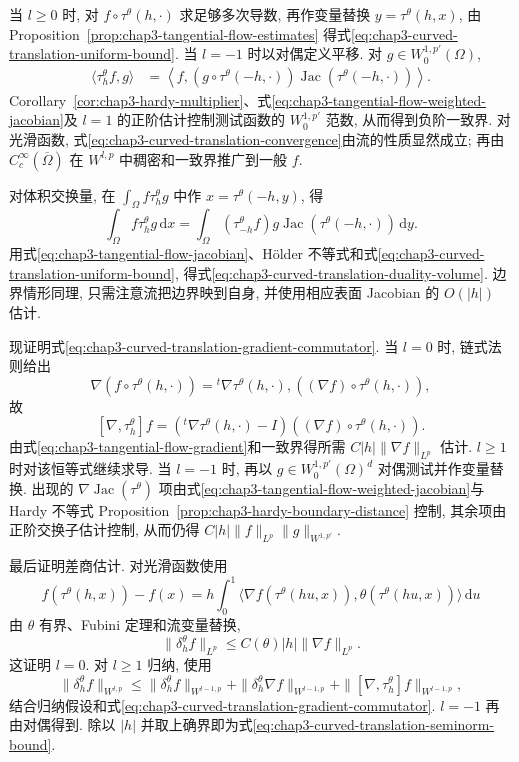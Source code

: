 \begin{Proof}
当 $l\geq0$ 时, 对 $f\circ\tau^\theta(h,\cdot)$ 求足够多次导数, 再作变量替换 $y=\tau^\theta(h,x)$, 由 Proposition~\ref{prop:chap3-tangential-flow-estimates} 得式\eqref{eq:chap3-curved-translation-uniform-bound}. 当 $l=-1$ 时以对偶定义平移. 对 $g\in W_0^{1,p'}(\Omega)$,
\begin{align*}
 \langle\tau_h^\theta f,g\rangle
 &=\left\langle f,
 (g\circ\tau^\theta(-h,\cdot))
 \operatorname{Jac}(\tau^\theta(-h,\cdot))\right\rangle.
\end{align*}
Corollary~\ref{cor:chap3-hardy-multiplier}、式\eqref{eq:chap3-tangential-flow-weighted-jacobian}及 $l=1$ 的正阶估计控制测试函数的 $W_0^{1,p'}$ 范数, 从而得到负阶一致界. 对光滑函数, 式\eqref{eq:chap3-curved-translation-convergence}由流的性质显然成立; 再由 $C_c^\infty(\overline\Omega)$ 在 $W^{l,p}$ 中稠密和一致界推广到一般 $f$.

对体积交换量, 在 $\int_\Omega f\tau_h^\theta g$ 中作 $x=\tau^\theta(-h,y)$, 得
\[
 \int_\Omega f\tau_h^\theta g\,\mathrm dx
 =\int_\Omega(\tau_{-h}^\theta f)g
 \operatorname{Jac}(\tau^\theta(-h,\cdot))\,\mathrm dy.
\]
用式\eqref{eq:chap3-tangential-flow-jacobian}、H\"older 不等式和式\eqref{eq:chap3-curved-translation-uniform-bound}, 得式\eqref{eq:chap3-curved-translation-duality-volume}. 边界情形同理, 只需注意流把边界映到自身, 并使用相应表面 Jacobian 的 $O(|h|)$ 估计.

现证明式\eqref{eq:chap3-curved-translation-gradient-commutator}. 当 $l=0$ 时, 链式法则给出
\[
 \nabla(f\circ\tau^\theta(h,\cdot))
 ={}^t\nabla\tau^\theta(h,\cdot),((\nabla f)\circ\tau^\theta(h,\cdot)),
\]
故
\[
 [\nabla,\tau_h^\theta]f
 =({}^t\nabla\tau^\theta(h,\cdot)-I)
 ((\nabla f)\circ\tau^\theta(h,\cdot)).
\]
由式\eqref{eq:chap3-tangential-flow-gradient}和一致界得所需 $C|h|\|\nabla f\|_{L^p}$ 估计. $l\geq1$ 时对该恒等式继续求导. 当 $l=-1$ 时, 再以 $g\in W_0^{1,p'}(\Omega)^d$ 对偶测试并作变量替换. 出现的 $\nabla\operatorname{Jac}(\tau^\theta)$ 项由式\eqref{eq:chap3-tangential-flow-weighted-jacobian}与 Hardy 不等式 Proposition~\ref{prop:chap3-hardy-boundary-distance} 控制, 其余项由正阶交换子估计控制, 从而仍得 $C|h|\|f\|_{L^p}\|g\|_{W^{1,p'}}$.

最后证明差商估计. 对光滑函数使用
\begin{equation}
 f(\tau^\theta(h,x))-f(x)
 =h\int_0^1\langle\nabla f(\tau^\theta(hu,x)),\theta(\tau^\theta(hu,x))\rangle\,\mathrm du
 \label{eq:chap3-curved-translation-fundamental-theorem}
\end{equation}
由 $\theta$ 有界、Fubini 定理和流变量替换,
\[
 \|\delta_h^\theta f\|_{L^p}
 \leq C(\theta)|h|\|\nabla f\|_{L^p}.
\]
这证明 $l=0$. 对 $l\geq1$ 归纳, 使用
\[
 \|\delta_h^\theta f\|_{W^{l,p}}
 \leq\|\delta_h^\theta f\|_{W^{l-1,p}}
 +\|\delta_h^\theta\nabla f\|_{W^{l-1,p}}
 +\|[\nabla,\tau_h^\theta]f\|_{W^{l-1,p}},
\]
结合归纳假设和式\eqref{eq:chap3-curved-translation-gradient-commutator}. $l=-1$ 再由对偶得到. 除以 $|h|$ 并取上确界即为式\eqref{eq:chap3-curved-translation-seminorm-bound}.
\end{Proof}

